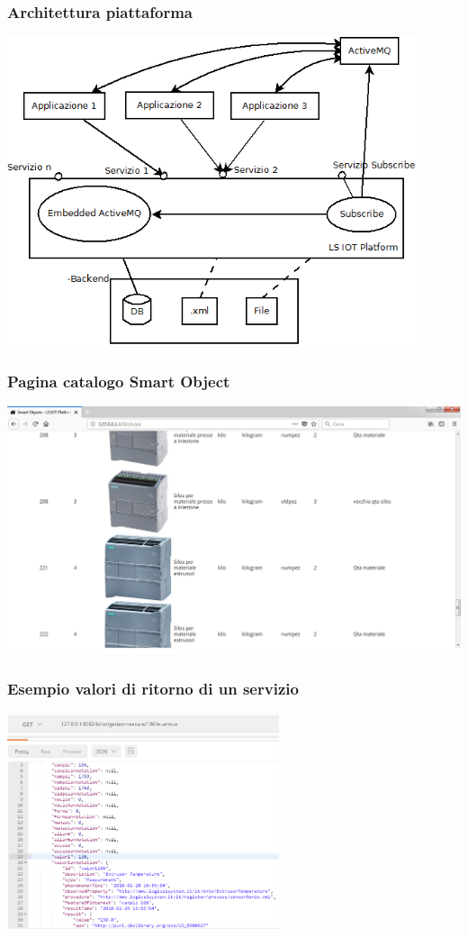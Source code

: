 \documentclass{beamer}
\begin{document}
\begin{frame}
\frametitle{Architettura piattaforma}
\includegraphics[width=0.9\textwidth]{images/architettura_piattaforma.png}
\end{frame}

\begin{frame}
\frametitle{Pagina catalogo Smart Object}
\includegraphics[width=1\textwidth]{images/SmartObjectsPlatform.png}
\end{frame}

\begin{frame}
\frametitle{Esempio valori di ritorno di un servizio}
\includegraphics[width=0.6\textwidth]{images/Postman1-corretto.png}
\end{frame}
\end{document}
